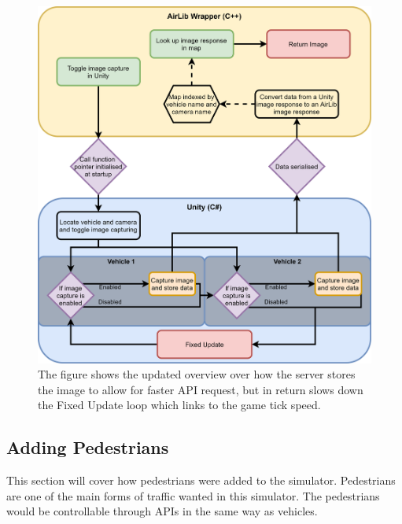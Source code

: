 \begin{figure}[p]
    \centering
    \includegraphics[width=1.0\textwidth]{06_Implementation/00_AirSim/Diagrams/imagecaptureUpdated.png}
    \caption[Get images API Updated]{The figure shows the updated overview over how the server stores the image to allow for faster API request, but in return slows down the Fixed Update loop which links to the game tick speed.} \label{06:imageCaptureUpdated}
\end{figure}

\subsection{Adding Pedestrians}
This section will cover how pedestrians were added to the simulator. Pedestrians are one of the main forms of traffic wanted in this simulator. The pedestrians would be controllable through APIs in the same way as vehicles. 

